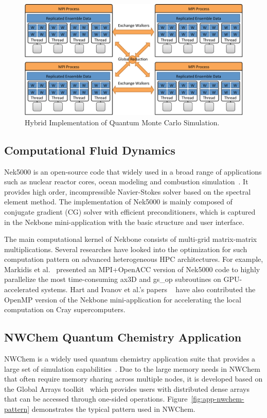\begin{figure}[ht]
\centering
\includegraphics[width=1\textwidth]{figures/background/app-qmcpack.pdf}
\caption{Hybrid Implementation of Quantum Monte Carlo Simulation.}
\label{fig:app-qmcpack}
\end{figure}

\subsection{Computational Fluid Dynamics}
Nek5000 is an open-source code that widely used in a broad range of
applications such as nuclear reactor cores, ocean modeling and combustion
simulation~\cite{nek5000}. It provides high order, incompressible
Navier-Stokes solver based on the spectral element method. The implementation
of Nek5000 is mainly composed of conjugate gradient (CG) solver with
efficient preconditioners, which is captured in the Nekbone mini-application
with the basic structure and user interface.

The main computational kernel of Nekbone consists of multi-grid matrix-matrix
multiplications. Several researches have looked into the optimization for
such computation pattern on advanced heterogeneous HPC architectures. For
example, Markidis et al.~\cite{nek-openacc} presented an MPI+OpenACC version
of Nek5000 code to highly parallelize the most time-consuming ax3D and
gs\_op subroutines on GPU-accelerated systems. Hart and Ivanov et al.'s papers
~\cite{nek-eva, nek-openmp4} have also contributed the OpenMP version of
the Nekbone mini-application for accelerating the local computation on
Cray supercomputers.


\subsection{NWChem Quantum Chemistry Application}
NWChem is a widely used quantum chemistry application suite that provides
a large set of simulation capabilities~\cite{nwchem}. Due to the large
memory needs in NWChem that often require memory sharing across multiple
nodes, it is developed based on the Global Arrays toolkit~\cite{GA_SC94}
which provides users with distributed dense arrays that can be accessed
through one-sided operations. Figure~\ref{fig:app-nwchem-pattern}
demonstrates the typical  pattern used in NWChem.


